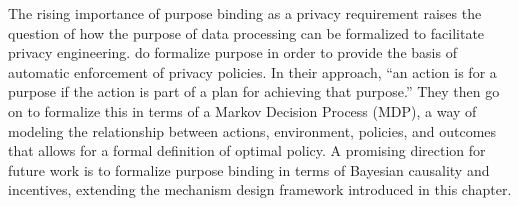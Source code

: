 \documentclass[../thesis.tex]{subfiles}
\begin{document}
The rising importance of purpose binding as a privacy requirement
raises the question of how the purpose of data processing can
be formalized to facilitate privacy engineering.
\citet{tschantz2012formalizing} \cite{tschantz13esorics}
do formalize purpose
in order to provide the basis of
automatic enforcement of privacy policies.
In their approach, ``an action is for a purpose if the
action is part of a plan for achieving that purpose.''
They then go on to formalize this in terms of
a Markov Decision Process (MDP), a way of modeling the relationship between actions,
environment, policies, and outcomes that allows for a formal definition of optimal policy.
A promising direction for future work is to formalize
purpose binding in terms of Bayesian causality and incentives,
extending the mechanism design framework introduced in
this chapter.
\end{document}
